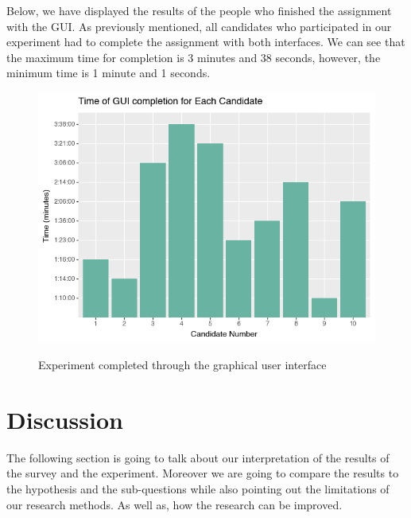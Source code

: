 \documentclass[]{report}
\begin{document}
Below, we have displayed the results of the people who finished the assignment with the GUI. As previously mentioned, all candidates who participated in our experiment had to complete the assignment with both interfaces. We can see that the maximum time for completion is 3 minutes and 38 seconds, however, the minimum time is 1 minute and 1 seconds.
\begin{figure}[H]
	\centering
	\includegraphics[width=0.75\linewidth]{ExperimentGui}\\
	\caption{Experiment completed through the graphical user interface}
	\label{fig: 21}
\end{figure}
	\newpage
	
	\section{Discussion}
	
	The following section is going to talk about our interpretation of the results of the survey and the experiment. Moreover we are going to compare the results to the hypothesis and the sub-questions while also pointing out the limitations of our research methods. As well as, how the research can be improved.
	
\end{document}
